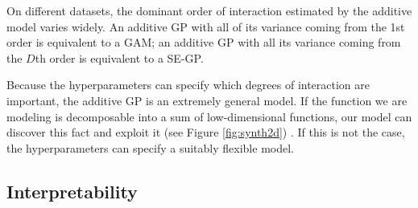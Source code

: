 On different datasets, the dominant order of interaction estimated by the additive model varies widely.  An additive GP with all of its variance coming from the 1st order is equivalent to a GAM; an additive GP with all its variance coming from the $D$th order is equivalent to a SE-GP.
%
%


Because the hyperparameters can specify which degrees of interaction are important, the additive GP is an extremely general model.  
  If the function we are modeling is decomposable into a sum of low-dimensional functions, our model can discover this fact and exploit it (see Figure \ref{fig:synth2d}) .  If this is not the case, the hyperparameters can specify a suitably flexible model.


\subsection{Interpretability}

